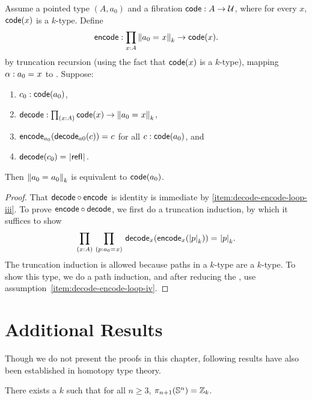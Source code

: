 \begin{lem}
Assume a pointed type $(A,a_0)$ and a fibration
$\code : A \to \type$, where for every $x$, $\code(x)$ is a $k$-type.
Define
\[
\encode : \prd{x:A} \trunc{k}{\id{a_0}{x}} \to \code(x).
\]
by truncation recursion (using the fact
that $\code(x)$ is a $k$-type), mapping $\alpha : \id{a_0}{x}$ to
. Suppose:
\begin{enumerate}
\item $c_0 : \code(a_0)$,
\item $\decode : \prd{x:A} \code(x) \to \trunc{k}{\id{a_0}{x}}$,
\item \label{item:decode-encode-loop-iii}
  $\id{\encode_{a_0}(\decode_{a0}(c))}{c}$ for all $c : \code(a_0)$, and
\item \label{item:decode-encode-loop-iv}
  $\id{\decode(c_0)}{\tproj{}{\refl{}}}$.
\end{enumerate}
Then $\trunc{k}{\id{a_0}{a_0}}$ is equivalent to $\code(a_0)$.
\end{lem}

\begin{proof}
That $\decode \circ \encode$ is identity is immediate by \ref{item:decode-encode-loop-iii}.
%
To prove $\encode \circ \decode$, we first do a truncation induction, by
which it suffices to show
\[
\prd{x:A}{p : \id{a_0}{x}} \id{\decode_{x}(\encode_{x}(\tproj{k}{p}))}{\tproj{k}{p}}.
\]
The truncation induction is allowed because paths in a $k$-type are a
$k$-type.  To show this type, we do a path induction, and after reducing
the \encode, use assumption~\ref{item:decode-encode-loop-iv}.
\end{proof}

\section{Additional Results}
\label{sec:moreresults}

Though we do not present the proofs in this chapter, following results have also been established in homotopy type theory.

\begin{thm}
There exists a $k$ such that for all $n \ge 3$, $\pi_{n+1}(\Sn ^n) =
\Z_k$.
\end{thm}

